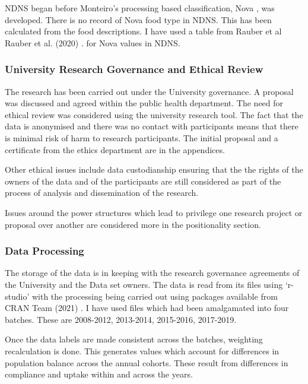 \documentclass[
]{article}
\begin{document}
NDNS began before Monteiro's processing based classification, Nova , was
developed. There is no record of Nova food type in NDNS. This has been
calculated from the food descriptions. I have used a table from Rauber
et al Rauber et al. (2020) . for Nova values in NDNS.

\hypertarget{university-research-governance-and-ethical-review}{%
\subsubsection{University Research Governance and Ethical
Review}\label{university-research-governance-and-ethical-review}}

The research has been carried out under the University governance. A
proposal was discussed and agreed within the public health department.
The need for ethical review was considered using the university research
tool. The fact that the data is anonymised and there was no contact with
participants means that there is minimal risk of harm to research
participants. The initial proposal and a certificate from the ethics
department are in the appendices.

Other ethical issues include data custodianship ensuring that the the
rights of the owners of the data and of the participants are still
considered as part of the process of analysis and dissemination of the
research.

Issues around the power structures which lead to privilege one research
project or proposal over another are considered more in the
positionality section.

\hypertarget{data-processing}{%
\subsubsection{Data Processing}\label{data-processing}}

The storage of the data is in keeping with the research governance
agreements of the University and the Data set owners. The data is read
from its files using `r-studio' with the processing being carried out
using packages available from CRAN Team (2021) . I have used files which
had been amalgamated into four batches. These are 2008-2012, 2013-2014,
2015-2016, 2017-2019.

Once the data labels are made consistent across the batches, weighting
recalculation is done. This generates values which account for
differences in population balance across the annual cohorts. These
result from differences in compliance and uptake within and across the
years.
\end{document}
